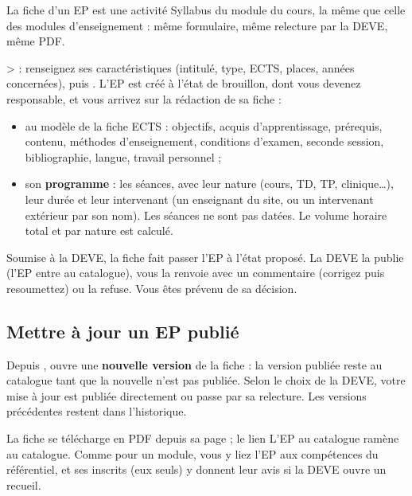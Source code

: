 \documentclass[11pt,a4paper]{article}
\begin{document}
La fiche d'un EP est une activité \og Syllabus du module\fg{} du cours, la même que celle des
modules d'enseignement : même formulaire, même relecture par la DEVE, même PDF.

 \textgreater{}  : renseignez ses
caractéristiques (intitulé, type, ECTS, places, années concernées), puis . L'EP est créé à l'état de brouillon, dont vous devenez responsable, et vous arrivez
sur la rédaction de sa fiche :
\begin{itemize}
  \item au modèle de la fiche ECTS : objectifs, acquis d'apprentissage, prérequis, contenu,
    méthodes d'enseignement, conditions d'examen, seconde session, bibliographie, langue,
    travail personnel ;
  \item son \textbf{programme} : les séances, avec leur nature (cours, TD, TP, clinique\dots),
    leur durée et leur intervenant (un enseignant du site, ou un intervenant extérieur par son
    nom). Les séances ne sont pas datées. Le volume horaire total et par nature est calculé.
\end{itemize}



Soumise à la DEVE, la fiche fait passer l'EP à l'état \og proposé\fg{}. La DEVE la publie (l'EP
entre au catalogue), vous la renvoie avec un commentaire (corrigez puis resoumettez) ou la
refuse. Vous êtes prévenu de sa décision.

\subsection{Mettre à jour un EP publié}

Depuis ,  ouvre une
\textbf{nouvelle version} de la fiche : la version publiée reste au catalogue tant que la
nouvelle n'est pas publiée. Selon le choix de la DEVE, votre mise à jour est publiée
directement ou passe par sa relecture. Les versions précédentes restent dans l'historique.


La fiche se télécharge en PDF depuis sa page ; le lien \og L'EP au catalogue\fg{} ramène au
catalogue. Comme pour un module, vous y liez l'EP aux compétences du référentiel, et ses
inscrits (eux seuls) y donnent leur avis si la DEVE ouvre un recueil.
\end{document}
